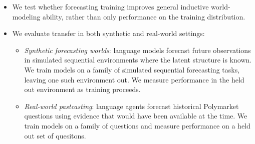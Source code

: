 \documentclass{article}
\begin{document}
\begin{itemize}
    \item We test whether forecasting training improves general inductive world-modeling ability, rather than only performance on the training distribution.

    \item  We evaluate transfer in both synthetic and real-world settings:
    \begin{itemize}
        \item \emph{Synthetic forecasting worlds}: language models forecast future observations in simulated sequential environments where the latent structure is known. We train models on a family of simulated sequential forecasting tasks, leaving one such environment out. We measure performance in the held out environment as training proceeds.

        \item \emph{Real-world pastcasting}: language agents forecast historical Polymarket questions using evidence that would have been available at the time.
        We train models on a family of questions and measure performance on a held out set of quesitons.
    \end{itemize}


\end{itemize}




\end{document}
